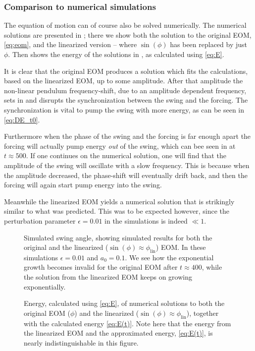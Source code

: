 \documentclass[10pt,letter, swedish, english,%
]{article}
\begin{document}
\subsubsection{Comparison to numerical simulations}
The equation of motion can of course also be solved numerically. The
numerical solutions are presented in ; there we show
both the solution to the original EOM, \eqref{eq:eom}, and the
linearized version -- where $\sin(\phi)$ has been replaced by just
$\phi$. Then  shows the energy of the solutions in
, as calculated using \eqref{eq:E}.

It is clear that the original EOM produces a solution which fits the
calculations, based on the linearized EOM, up to some amplitude. After
that amplitude the non-linear pendulum frequency-shift, due to an
amplitude dependent frequency, sets in and disrupts the
synchronization between the swing and the forcing. The synchronization is vital
to pump the swing with more energy, as can be seen in
\eqref{eq:DE_t0}. 

Furthermore when the phase of the swing and the
forcing is far enough apart the forcing will actually pump energy
\emph{out} of the swing, which can bee seen in  at
$t\approx500$. If one continues on the numerical solution, one will
find that the amplitude of the swing will oscillate with a slow
frequency. This is because when the amplitude decreased, the
phase-shift will eventually drift back, and then the forcing
will again start pump energy into the swing. 

Meanwhile the linearized EOM yields a numerical solution that is
strikingly similar to what was predicted. This was to be expected
however, since the perturbation parameter $\epsilon=0.01$ in the
simulations is indeed $\ll1$.



\begin{figure}\centering
\caption{Simulated swing angle, showing simulated results for both the
  original and the linearized ($\sin(\phi)\approx\phi_\text{lin}$)
  EOM. In these simulations $\epsilon=0.01$ and $a_0=0.1$. We see how the
  exponential growth becomes invalid for the original EOM after
  $t\approx400$, while the solution from the linearized EOM keeps on
  growing exponentially. 
}
\label{fig:sim}
\end{figure}

\begin{figure}\centering
\caption{Energy, calculated using \eqref{eq:E}, of numerical solutions
  to both the original EOM ($\phi$) and the linearized
  ($\sin(\phi)\approx\phi_\text{lin}$), together with the calculated energy
  \eqref{eq:E(t)}. Note here that the energy from the linearized EOM
  and the approximated energy, \eqref{eq:E(t)}, is nearly
  indistinguishable in this figure.
}
\label{fig:sim_E}
\end{figure}
\end{document}
